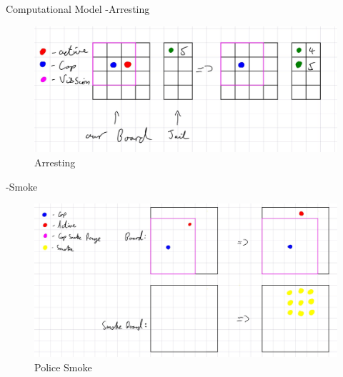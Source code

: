\documentclass[final,hyperref={pdfpagelabels=false}]{beamer}
\begin{document}
\begin{frame}[t]
\begin{columns}[t]
\begin{column}{.32\textwidth}
\begin{block}{Computational Model}
					-Arresting
					\begin{figure}[H]
						\includegraphics[width=\linewidth]{arresting visual.png}
						\caption{Arresting}
						\label{fig:frenchriot}
					\end{figure}	
					-Smoke
					\begin{figure}[H]
						\includegraphics[width=\linewidth]{smoke visual.png}
						\caption{Police Smoke}
						\label{fig:frenchriot}
					\end{figure}	
					

\end{block}
\end{column}
\end{columns}
\end{frame}
\end{document}
